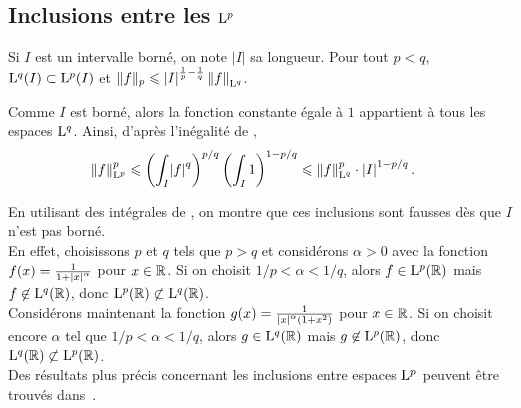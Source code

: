 \subsection{Inclusions entre les $\mathrm{L}^p$}

\begin{theo}
Si $I$ est un intervalle borné, on note $|I|$ sa longueur. Pour tout $p < q$, $\mathrm{L}^q(I) \subset \mathrm{L}^p(I)$ et $\|f\|_p \leqslant \mathopen{}\left| I \right|^{\frac{1}{p} - \frac{1}{q}} \norm{f}_{\mathrm{L}^q}$.
\end{theo}

\begin{demo}
Comme $I$ est borné, alors la fonction constante égale à $1$ appartient à tous les espaces $\mathrm{L}^q$. Ainsi, d'après l'inégalité de ,
\begin{align*}
\norm{f}_{\mathrm{L}^p}^p
&\leqslant \left(\int_I \mathopen{}\left| f \right|^q\right)^{p/q} \left(\int_I 1\right)^{1-p/q}
\leqslant \norm{f}_{\mathrm{L}^q}^p \cdot \mathopen{}\left| I \right|^{1-p/q}.
\end{align*}
\end{demo}

\begin{remarque}
En utilisant des intégrales de , on montre que ces inclusions sont fausses dès que $I$ n'est pas borné. \\
En effet, choisissons $p$ et $q$ tels que $p > q$ et considérons $\alpha > 0$ avec la fonction $f(x) = \frac{1}{1+\mathopen{}\left| x \right|^\alpha}$ pour $x \in \mathbb{R}$. Si on choisit $1/p < \alpha < 1/q$, alors $f \in \mathrm{L}^p(\mathbb{R})$ mais $f \not\in \mathrm{L}^q(\mathbb{R})$, donc $\mathrm{L}^p(\mathbb{R}) \not\subset \mathrm{L}^q(\mathbb{R})$. \\
Considérons maintenant la fonction $g(x) = \frac{1}{\mathopen{}\left| x \right|^\alpha (1+x^2)}$ pour $x \in \mathbb{R}$. Si on choisit encore $\alpha$ tel que $1/p <  \alpha < 1/q$, alors $g \in \mathrm{L}^q(\mathbb{R})$ mais $g \not\in \mathrm{L}^p(\mathbb{R})$, donc $\mathrm{L}^q(\mathbb{R}) \not\subset \mathrm{L}^p(\mathbb{R})$.\\
Des résultats plus précis concernant les inclusions entre espaces $\mathrm{L}^p$ peuvent être trouvés dans~\cite{rudin2009}.
\end{remarque}